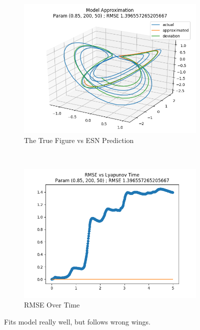 \documentclass{article}
\begin{document}
\begin{figure}[H]
    \centering
    \begin{subfigure}[b]{0.45\textwidth}
        \includegraphics[width=\textwidth]{doc/paper/images/lorenz/rank_4_param_300_fit.png}
        \caption{The True Figure vs ESN Prediction}
        \label{fig:lorenz_r4_fit}
    \end{subfigure}
    ~
    \begin{subfigure}[b]{0.45\textwidth}
        \includegraphics[width=\textwidth]{doc/paper/images/lorenz/rank_4_param_300_rmse.png}
        \caption{RMSE Over Time}
        \label{fig:lorenz_r4_rmse}
    \end{subfigure}
    \caption{Fits model really well, but follows wrong wings.}
    \label{fig:lorenz_r4}
\end{figure}
\end{document}
